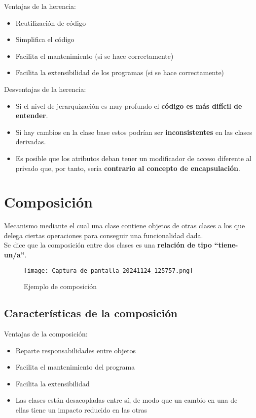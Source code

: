 \documentclass{article}
\begin{document}
Ventajas de la herencia: 
\begin{itemize}
    \item Reutilización de código
    \item Simplifica el código
    \item Facilita el mantenimiento (si se hace correctamente)
    \item Facilita la extensibilidad de los programas (si se hace correctamente)
\end{itemize}

Desventajas de la herencia: 
\begin{itemize}
    \item Si el nivel de jerarquización es muy profundo el \textbf{código es más difícil de entender}.
    \item Si hay cambios en la clase base estos podrían ser \textbf{inconsistentes} en las clases derivadas.
    \item Es posible que los atributos deban tener un modificador de acceso diferente al privado que, por tanto, sería \textbf{contrario al concepto de encapsulación}.
\end{itemize}

\section{Composición}
Mecanismo mediante el cual una clase contiene objetos de otras clases a los que delega ciertas operaciones para conseguir una funcionalidad dada. \\
Se dice que la composición entre dos clases es una \textbf{relación de tipo “tiene-un/a”}.

\begin{figure}[h]
    \centering
    \texttt{[image: Captura de pantalla\_20241124\_125757.png]}
    \caption{Ejemplo de composición}
\end{figure}

\subsection{Características de la composición}

Ventajas de la composición: 
\begin{itemize}
    \item Reparte responsabilidades entre objetos
    \item Facilita el mantenimiento del programa
    \item Facilita la extensibilidad
    \item Las clases están desacopladas entre sí, de modo que un cambio en una de ellas tiene un impacto reducido en las otras
\end{itemize}
\end{document}
